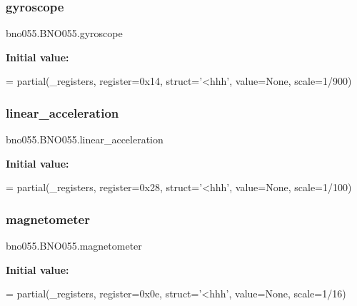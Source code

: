 \subsubsection{\texorpdfstring{gyroscope}{gyroscope}}
{\footnotesize\ttfamily bno055.\+B\+N\+O055.\+gyroscope\hspace{0.3cm}{\ttfamily [static]}}

{\bfseries Initial value\+:}
\begin{DoxyCode}
=  partial(\_registers, register=0x14, struct=\textcolor{stringliteral}{'<hhh'},
                        value=\textcolor{keywordtype}{None}, scale=1/900)
\end{DoxyCode}
\mbox{\label{classbno055_1_1BNO055_af54688ecc717a7fc9ac55108b93b8735}} 
\subsubsection{\texorpdfstring{linear\+\_\+acceleration}{linear\_acceleration}}
{\footnotesize\ttfamily bno055.\+B\+N\+O055.\+linear\+\_\+acceleration\hspace{0.3cm}{\ttfamily [static]}}

{\bfseries Initial value\+:}
\begin{DoxyCode}
=  partial(\_registers, register=0x28, struct=\textcolor{stringliteral}{'<hhh'},
                                  value=\textcolor{keywordtype}{None}, scale=1/100)
\end{DoxyCode}
\mbox{\label{classbno055_1_1BNO055_a7f7662e62f4a2b86f4fff6b0cf511430}} 
\subsubsection{\texorpdfstring{magnetometer}{magnetometer}}
{\footnotesize\ttfamily bno055.\+B\+N\+O055.\+magnetometer\hspace{0.3cm}{\ttfamily [static]}}

{\bfseries Initial value\+:}
\begin{DoxyCode}
=  partial(\_registers, register=0x0e, struct=\textcolor{stringliteral}{'<hhh'},
                           value=\textcolor{keywordtype}{None}, scale=1/16)
\end{DoxyCode}
\mbox{\label{classbno055_1_1BNO055_a3b28b229a63940c93f4222a3597ddb4d}} 
